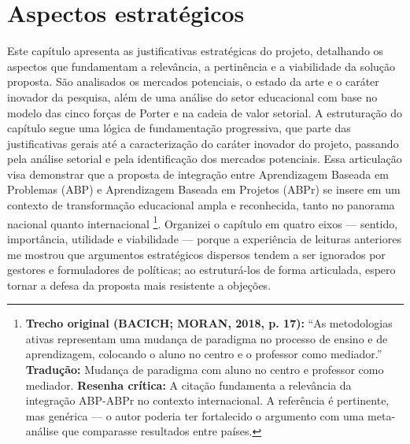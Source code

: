 ﻿%

\chapter{Aspectos estratégicos}
\label{chap:aspectos_estrategicos}

Este capítulo apresenta as justificativas estratégicas do projeto, detalhando os aspectos que fundamentam a relevância, a pertinência e a viabilidade da solução proposta. São analisados os mercados potenciais, o estado da arte e o caráter inovador da pesquisa, além de uma análise do setor educacional com base no modelo das cinco forças de Porter e na cadeia de valor setorial. A estruturação do capítulo segue uma lógica de fundamentação progressiva, que parte das justificativas gerais até a caracterização do caráter inovador do projeto, passando pela análise setorial e pela identificação dos mercados potenciais. Essa articulação visa demonstrar que a proposta de integração entre Aprendizagem Baseada em Problemas (ABP) e Aprendizagem Baseada em Projetos (ABPr) se insere em um contexto de transformação educacional ampla e reconhecida, tanto no panorama nacional quanto internacional \cite{BACICH2018}\footnote{\textbf{Trecho original (BACICH; MORAN, 2018, p. 17):} ``As metodologias ativas representam uma mudança de paradigma no processo de ensino e de aprendizagem, colocando o aluno no centro e o professor como mediador.'' \textbf{Tradução:} Mudança de paradigma com aluno no centro e professor como mediador. \textbf{Resenha crítica:} A citação fundamenta a relevância da integração ABP-ABPr no contexto internacional. A referência é pertinente, mas genérica — o autor poderia ter fortalecido o argumento com uma meta-análise que comparasse resultados entre países.}. Organizei o capítulo em quatro eixos — sentido, importância, utilidade e viabilidade — porque a experiência de leituras anteriores me mostrou que argumentos estratégicos dispersos tendem a ser ignorados por gestores e formuladores de políticas; ao estruturá-los de forma articulada, espero tornar a defesa da proposta mais resistente a objeções.

